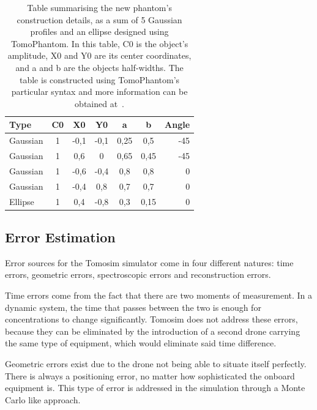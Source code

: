 \begin{table}[htpb]
    \centering
    \caption{Table summarising the new phantom's construction details,
    as a sum of 5 Gaussian profiles and an ellipse designed using
    TomoPhantom. In this table, C0 is the object's amplitude, X0 and Y0
    are its center coordinates, and a and b are the objects half-widths.
    The table is constructed using TomoPhantom's particular syntax and
    more information can be obtained at~\cite{Kazantsev2018}.}
    \label{tab:new_phantom}
    \begin{tabular}{@{}lcccccr@{}}
    \hline
    \textbf{Type} & \textbf{C0} & \textbf{X0} & \textbf{Y0} & \textbf{a}
                  & \textbf{b} & \textbf{\textbf{Angle}} \\ \hline
    Gaussian & 1 & -0,1 & -0,1 & 0,25 & 0,5 & -45 \\
    Gaussian & 1 & 0,6 & 0 & 0,65 & 0,45 & -45 \\
    Gaussian & 1 & -0,6 & -0,4 & 0,8 & 0,8 & 0 \\
    Gaussian & 1 & -0,4 & 0,8 & 0,7 & 0,7 & 0 \\
    Ellipse & 1 & 0,4 & -0,8 & 0,3 & 0,15 & 0 \\ \hline
    \end{tabular}
\end{table}

\subsection{Error Estimation}%
\label{sub:error_estimation}

Error sources for the Tomosim simulator come in four different natures:
time errors, geometric errors, spectroscopic errors and reconstruction
errors.

Time errors come from the fact that there are two moments of
measurement. In a dynamic system, the time that passes between the two
is enough for concentrations to change significantly. Tomosim does not
address these errors, because they can be eliminated by the introduction
of a second drone carrying the same type of equipment, which would
eliminate said time difference.

Geometric errors exist due to the drone not being able to situate
itself perfectly. There is always a positioning error, no matter how
sophisticated the onboard equipment is. This type of error is addressed
in the simulation through a Monte Carlo like approach.

